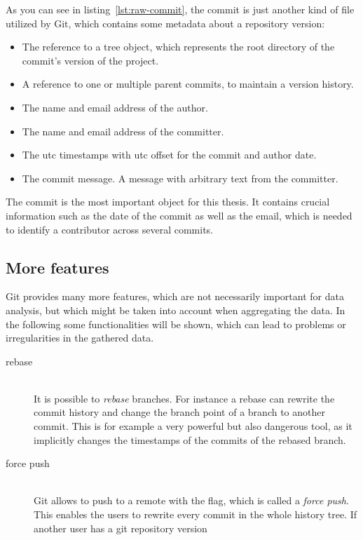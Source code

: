 As you can see in listing~\ref{lst:raw-commit}, the commit is just another kind of file utilized by Git, which contains some metadata about a repository version:

\begin{itemize}
    \item The reference to a tree object, which represents the root directory of the commit's version of the project.
    \item A reference to one or multiple parent commits, to maintain a version history.
    \item The name and email address of the author.
    \item The name and email address of the committer.
    \item The \ac{utc} timestamps with \ac{utc} offset for the commit and author date.
    \item The commit message. A message with arbitrary text from the committer.
\end{itemize}

The commit is the most important object for this thesis.
It contains crucial information such as the date of the commit as well as the email, which is needed to identify a contributor across several commits.


\subsection{More features}\label{more-git-features}

Git provides many more features, which are not necessarily important for data analysis, but which might be taken into account when aggregating the data.
In the following some functionalities will be shown, which can lead to problems or irregularities in the gathered data.

\begin{description}
    \item[rebase] \hfill \\
        It is possible to \emph{rebase} branches. For instance a rebase can rewrite the commit history and change the branch point of a branch to another commit.
        This is for example a very powerful but also dangerous tool, as it implicitly changes the timestamps of the commits of the rebased branch.

    \item[force push] \hfill \\
        Git allows to push to a remote with the  flag, which is called a \emph{force push}.
        This enables the users to rewrite every commit in the whole history tree. If another user has a git repository version
\end{description}

